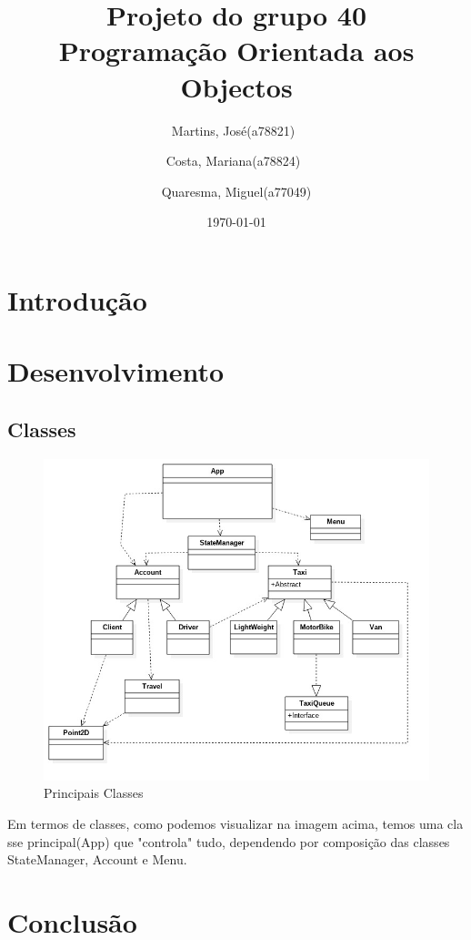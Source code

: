\documentclass[a4paper,12pt,portuguese]{report}
\title{Projeto do grupo 40 \\Programação Orientada aos Objectos}
\author{Martins, José(a78821)\
        \and
        Costa, Mariana(a78824)\
        \and
        Quaresma, Miguel(a77049)
        }
\date{\today}
\begin{document}
 
\begin{titlepage}
\maketitle
\end{titlepage}
 
\tableofcontents
 
\chapter{Introdução}


\chapter{Desenvolvimento}

\section{Classes}

\begin{figure}[ht!]
    \centering
        \includegraphics[width=120mm]{graph.jpg}
    \caption{Principais Classes}
\end{figure}

Em termos de classes, como podemos visualizar na imagem acima, temos uma cla    sse principal(App) que "controla" tudo, dependendo por composição das classes StateManager, Account e Menu.

\chapter{Conclusão}
\end{document}
